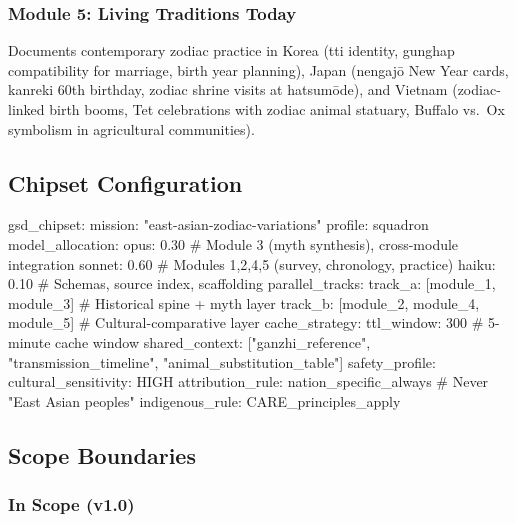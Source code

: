 \documentclass[11pt,letterpaper]{article}
\begin{document}
\subsubsection{Module 5: Living Traditions Today}

Documents contemporary zodiac practice in Korea (tti identity, gunghap compatibility for marriage, birth year planning), Japan (nengaj\={o} New Year cards, kanreki 60th birthday, zodiac shrine visits at hatsumōde), and Vietnam (zodiac-linked birth booms, Tet celebrations with zodiac animal statuary, Buffalo vs.\ Ox symbolism in agricultural communities).

\subsection{Chipset Configuration}

\begin{asciibox}
gsd_chipset:
  mission: "east-asian-zodiac-variations"
  profile: squadron
  model_allocation:
    opus: 0.30    # Module 3 (myth synthesis), cross-module integration
    sonnet: 0.60  # Modules 1,2,4,5 (survey, chronology, practice)
    haiku: 0.10   # Schemas, source index, scaffolding
  parallel_tracks:
    track_a: [module_1, module_3]   # Historical spine + myth layer
    track_b: [module_2, module_4, module_5]  # Cultural-comparative layer
  cache_strategy:
    ttl_window: 300  # 5-minute cache window
    shared_context: ["ganzhi_reference", "transmission_timeline",
                     "animal_substitution_table"]
  safety_profile:
    cultural_sensitivity: HIGH
    attribution_rule: nation_specific_always  # Never "East Asian peoples"
    indigenous_rule: CARE_principles_apply
\end{asciibox}

\subsection{Scope Boundaries}

\subsubsection{In Scope (v1.0)}
\end{document}
